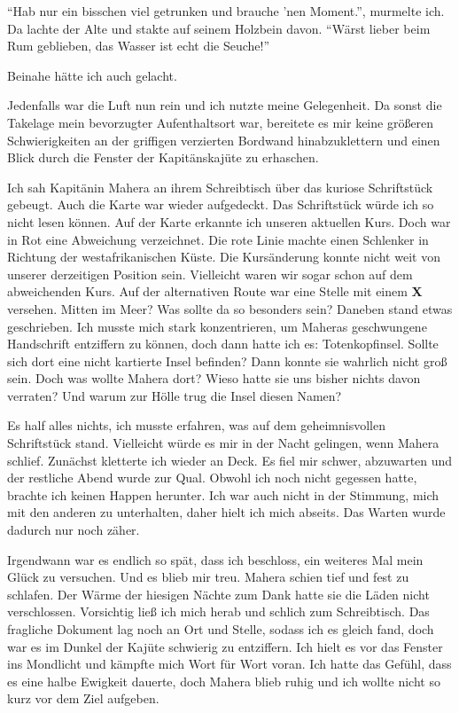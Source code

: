 \enquote{Hab nur ein bisschen viel getrunken und brauche 'nen Moment.}, murmelte ich. Da lachte der Alte und stakte auf seinem Holzbein davon. \enquote{Wärst lieber beim Rum geblieben, das Wasser ist echt die Seuche!}

Beinahe hätte ich auch gelacht.

Jedenfalls war die Luft nun rein und ich nutzte meine Gelegenheit. Da sonst die Takelage mein bevorzugter Aufenthaltsort war, bereitete es mir keine größeren Schwierigkeiten an der griffigen verzierten Bordwand hinabzuklettern und einen Blick durch die Fenster der Kapitänskajüte zu erhaschen.

Ich sah Kapitänin Mahera an ihrem Schreibtisch über das kuriose Schriftstück gebeugt. Auch die Karte war wieder aufgedeckt. Das Schriftstück würde ich so nicht lesen können. Auf der Karte erkannte ich unseren aktuellen Kurs. Doch war in Rot eine Abweichung verzeichnet. Die rote Linie machte einen Schlenker in Richtung der westafrikanischen Küste. Die Kursänderung konnte nicht weit von unserer derzeitigen Position sein. Vielleicht waren wir sogar schon auf dem abweichenden Kurs. Auf der alternativen Route war eine Stelle mit einem {\boldfont\textbf{X}} versehen. Mitten im Meer? Was sollte da so besonders sein? Daneben stand etwas geschrieben. Ich musste mich stark konzentrieren, um Maheras geschwungene Handschrift entziffern zu können, doch dann hatte ich es: Totenkopfinsel. Sollte sich dort eine nicht kartierte Insel befinden? Dann konnte sie wahrlich nicht groß sein. Doch was wollte Mahera dort? Wieso hatte sie uns bisher nichts davon verraten? Und warum zur Hölle trug die Insel diesen Namen?

Es half alles nichts, ich musste erfahren, was auf dem geheimnisvollen Schriftstück stand. Vielleicht würde es mir in der Nacht gelingen, wenn Mahera schlief. Zunächst kletterte ich wieder an Deck. Es fiel mir schwer, abzuwarten und der restliche Abend wurde zur Qual. Obwohl ich noch nicht gegessen hatte, brachte ich keinen Happen herunter. Ich war auch nicht in der Stimmung, mich mit den anderen zu unterhalten, daher hielt ich mich abseits. Das Warten wurde dadurch nur noch zäher.

Irgendwann war es endlich so spät, dass ich beschloss, ein weiteres Mal mein Glück zu versuchen. Und es blieb mir treu. Mahera schien tief und fest zu schlafen. Der Wärme der hiesigen Nächte zum Dank hatte sie die Läden nicht verschlossen. Vorsichtig ließ ich mich herab und schlich zum Schreibtisch. Das fragliche Dokument lag noch an Ort und Stelle, sodass ich es gleich fand, doch war es im Dunkel der Kajüte schwierig zu entziffern. Ich hielt es vor das Fenster ins Mondlicht und kämpfte mich Wort für Wort voran. Ich hatte das Gefühl, dass es eine halbe Ewigkeit dauerte, doch Mahera blieb ruhig und ich wollte nicht so kurz vor dem Ziel aufgeben.

